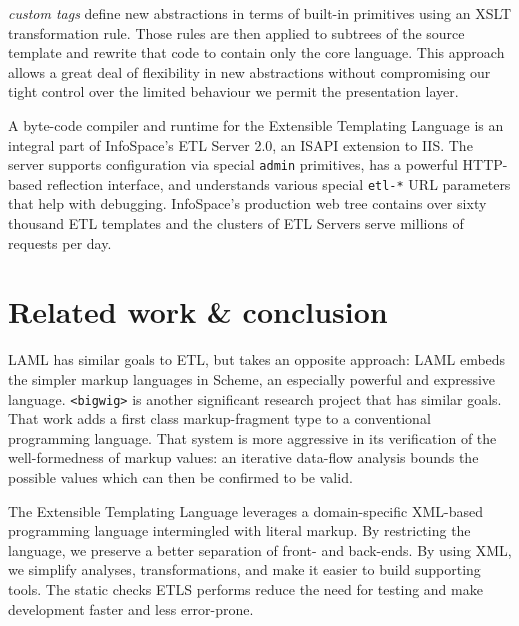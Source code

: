 \documentclass{www2003-submission}
\newcommand{\smtexttt}[1]{{\small\texttt{#1}}}
\newcommand{\etl}{ETL}
\begin{document}
\emph{custom tags} define new abstractions in terms of 
built-in primitives using an XSLT transformation rule.  Those
rules are then applied to subtrees of the source template and rewrite
that code to contain only the core language.  This approach allows a
great deal of flexibility in new abstractions without compromising our
tight control over the limited behaviour we permit the presentation
layer.

A byte-code compiler and runtime for the Extensible Templating
Language is an integral part of InfoSpace's \etl{} Server 2.0,
an ISAPI extension to IIS.  The server supports configuration 
via special \smtexttt{admin} primitives, has a powerful
HTTP-based reflection interface, and understands various special
\smtexttt{etl-*} URL parameters that help with debugging.
InfoSpace's production web tree contains over sixty thousand \etl{}
templates and the clusters of \etl{} Servers serve millions of
requests per day.

\section{Related work \& conclusion}
\label{sec-related-work}

LAML has similar goals to \etl{}, but takes an opposite approach: LAML
embeds the simpler markup languages in Scheme, an especially powerful
and expressive language.  \verb|<bigwig>| is another significant
research project that has similar goals.  That work adds a first class
markup-fragment type to a conventional programming language.  That
system is more aggressive in its verification of the well-formedness
of markup values: an iterative data-flow analysis bounds the possible
values which can then be confirmed to be valid.

The Extensible Templating Language leverages a domain-specific
XML-based programming language intermingled with literal markup.  By
restricting the language, we preserve a better separation of front-
and back-ends. By using XML, we simplify analyses, transformations,
and make it easier to build supporting tools.  The static checks ETLS
performs reduce the need for testing and make development faster and
less error-prone.



\balancecolumns

\end{document}
